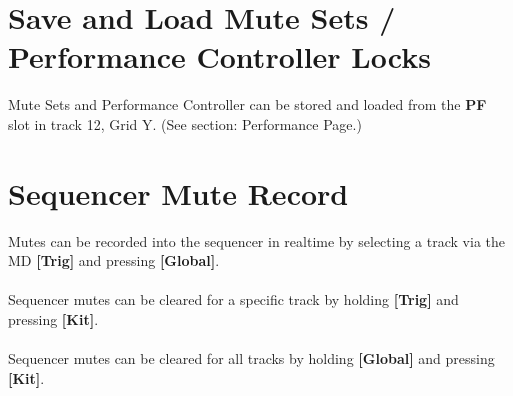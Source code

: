 \section{Save and Load Mute Sets / Performance Controller Locks}
Mute Sets and Performance Controller can be stored and loaded from the \textbf{PF} slot in track 12, Grid Y. (See section: Performance Page.)


\section{Sequencer Mute Record}
Mutes can be recorded into the sequencer in realtime by selecting a track via the MD \textbf{[Trig]} and pressing \textbf{[Global]}.\\\\
Sequencer mutes can be cleared for a specific track by holding \textbf{[Trig]} and pressing \textbf{[Kit]}.\\\\
Sequencer mutes can be cleared for all tracks by holding \textbf{[Global]} and pressing \textbf{[Kit]}.


